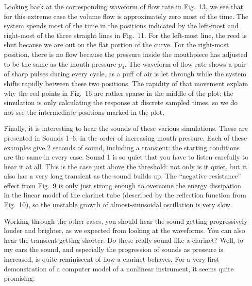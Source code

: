 
  Looking back at the corresponding waveform of flow rate in Fig.\ 13, we see 
  that for this extreme case the volume flow is approximately zero most of the 
  time. The system spends most of the time in the positions indicated by the 
  left-most and right-most of the three straight lines in Fig.\ 11. For the 
  left-most line, the reed is shut because we are out on the flat portion of 
  the curve. For the right-most position, there is no flow because the pressure 
  inside the mouthpiece has adjusted to be the same as the mouth pressure 
  $p_0$. The waveform of flow rate shows a pair of sharp pulses during every 
  cycle, as a puff of air is let through while the system shifts rapidly 
  between these two positions. The rapidity of that movement explain why the 
  red points in Fig.\ 16 are rather sparse in the middle of the plot: the 
  simulation is only calculating the response at discrete sampled times, so we 
  do not see the intermediate positions marked in the plot. 

  Finally, it is interesting to hear the sounds of these various simulations. 
  These are presented in Sounds 1--6, in the order of increasing mouth 
  pressure. Each of these examples give 2 seconds of sound, including a 
  transient: the starting conditions are the same in every case. Sound 1 is so 
  quiet that you have to listen carefully to hear it at all. This is the case 
  just above the threshold: not only is it quiet, but it also has a very long 
  transient as the sound builds up. The ``negative resistance'' effect from 
  Fig.\ 9 is only just strong enough to overcome the energy dissipation in the 
  linear model of the clarinet tube (described by the reflection function from 
  Fig.\ 10), so the unstable growth of almost-sinusoidal oscillation is very 
  slow. 

  Working through the other cases, you should hear the sound getting 
  progressively louder and brighter, as we expected from looking at the 
  waveforms. You can also hear the transient getting shorter. Do these really 
  sound like a clarinet? Well, to my ears the sound, and especially the 
  progression of sounds as pressure is increased, is quite reminiscent of how a 
  clarinet behaves. For a very first demonstration of a computer model of a 
  nonlinear instrument, it seems quite promising. 

